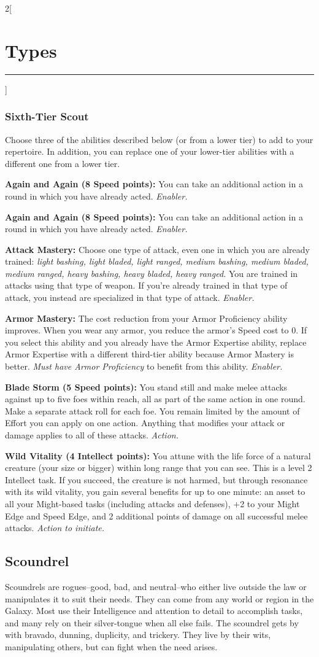 \documentclass[a4paper,10pt,final]{book}
\newcommand{\HRule}{\rule{\linewidth}{0.5mm}} %
\newcommand{\newSection}[1]{\section*{#1} \addcontentsline{toc}{section}{#1} \label{sec:#1} \HRule}
\newcommand{\itemAbility}[2]{\textcolor{25gray}{\textbullet\textbf{ #1:}} {#2}\par}
\newcommand{\enabler}{\textit{ Enabler.}}
\newcommand{\action}{\textit{ Action.}}
\newcommand{\actionInit}{\textit{ Action to initiate.}}
\newenvironment{docsection}[1]
{
  \begin{multicols*}{2}[\newSection{#1}]
}
{
  \end{multicols*}
  \newpage
}
\begin{document}
\begin{docsection}{Types}
\subsubsection*{Sixth-Tier Scout}
\label{subsub:scoutSixthTier}
Choose three of the abilities described
below (or from a lower tier) to add to your
repertoire. In addition, you can replace one
of your lower-tier abilities with a different
one from a lower tier.\par
\itemAbility{Again and Again (8 Speed points)}{You
can take an additional action in a round in
which you have already acted.\enabler}
\itemAbility{Again and Again (8 Speed points)}{You
can take an additional action in a round in
which you have already acted.\enabler}
\itemAbility{Attack Mastery}{Choose one
type of attack, even one in which you are
already trained: \textit{light bashing, light bladed,
light ranged, medium bashing, medium
bladed, medium ranged, heavy bashing,
heavy bladed, heavy ranged.} You are
trained in attacks using that type of weapon.
If you’re already trained in that type of
attack, you instead are specialized in that
type of attack.\enabler}
\itemAbility{Armor Mastery}{The cost reduction
from your Armor Proficiency ability
improves. When you wear any armor, you
reduce the armor’s Speed cost to 0. If you
select this ability and you already have the
Armor Expertise ability, replace
Armor Expertise with a different
third-tier ability because Armor Mastery is better.
\textit{Must have Armor Proficiency} to benefit from this ability.\enabler}
\itemAbility{Blade Storm (5 Speed points)}{You stand
still and make melee attacks against up
to five foes within reach, all as part of the
same action in one round. Make a separate
attack roll for each foe. You remain limited
by the amount of Effort you can apply on
one action. Anything that modifies your
attack or damage applies to all of these
attacks.\action}
\itemAbility{Wild Vitality (4 Intellect points)}{You attune
with the life force of a natural creature (your
size or bigger) within long range that you
can see. This is a level 2 Intellect task. If you
succeed, the creature is not harmed, but
through resonance with its wild vitality, you
gain several benefits for up to one minute: an
asset to all your Might-based tasks (including
attacks and defenses), +2 to your Might Edge
and Speed Edge, and 2 additional points
of damage on all successful melee attacks.\actionInit}



\subsection*{Scoundrel} %
\label{sub:scoundrel}
Scoundrels are rogues--good, bad, and neutral--who either live outside the law or manipulates it to suit their needs. They can come from any world or region in the Galaxy. Most use their Intelligence and attention to detail to accomplish tasks, and many rely on their silver-tongue when all else fails. The scoundrel gets by with bravado, dunning, duplicity, and trickery. They live by their wits, manipulating others, but can fight when the need arises.\para 


\end{docsection}
\end{document}
